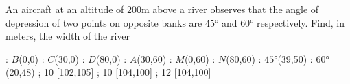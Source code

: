 
%
%
%
%
% 
% 

\question An aircraft at an altitude of $200$m above a river observes that the angle 
of depression of two points on opposite banks are $\ang{45}$ and $\ang{60}$ respectively.
Find, in meters, the width of the river

\insertQR{}

\ifprintanswers
  \begin{marginfigure}
      : $B$(0,0)
      : $C$(30,0)
      : $D$(80,0)
      : $A$(30,60)
      : $M$(0,60)
      : $N$(80,60)
      : $\ang{45}$(39,50) %
      : $\ang{60}$(20,48)
    \figdrawbegin{}
      \figdrawline [100,103,102,101,100]
      \figdrawline [103,101]
      \figdrawline [104,105]
       ; 10 [102,105] 
       ; 10 [104,100] 
       ; 12 [104,100] 
    \figdrawend
    \centerline{\box\figBoxA}
  \end{marginfigure}
\fi 


